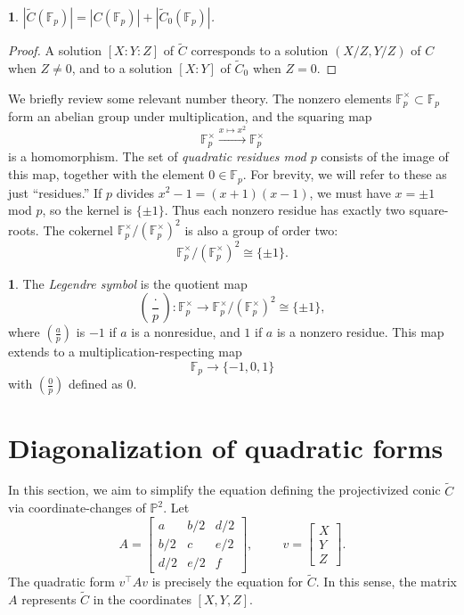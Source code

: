 \documentclass[10pt,a4paper]{amsart}
\numberwithin{equation}{section}
\numberwithin{figure}{section}
\theoremstyle{definition}
\theoremstyle{remark}
\theoremstyle{plain}
\theoremstyle{plain}
\theoremstyle{definition}
\newtheorem{defn}{\protect\definitionname}[section]
\theoremstyle{plain}
\theoremstyle{plain}
\newtheorem{lem}{\protect\lemmaname}[section]
\providecommand{\definitionname}{Definition}
\providecommand{\lemmaname}{Lemma}
\newcommand{\legendre}[2]{\genfrac{(}{)}{}{}{#1}{#2}}
\renewcommand{\P}{\mathbb{P}}
\newcommand{\F}{\mathbb{F}}
\begin{document}
    \begin{lem}\label{lem:relate-solutions-affine-proj}
        $|\widetilde{C}(\F_p)| = |C(\F_p)| + |\widetilde{C}_0(\F_p)|$.
    \end{lem} 
    \begin{proof}
        A solution $[X:Y:Z]$ of $\widetilde{C}$ corresponds 
        to a solution $(X/Z,Y/Z)$ of $C$ when $Z \neq 0$,
        and to a solution $[X:Y]$ of $\widetilde{C}_0$ 
        when $Z = 0$.  
    \end{proof}
	We briefly review some relevant number theory.
	The nonzero elements $\F_p^\times \subset \F_p$ form an abelian
	group under multiplication, and the squaring map 
	\[ \F^\times_p \xrightarrow{x \mapsto x^2} \F^\times_p \] 
	is a homomorphism. The set of \emph{quadratic residues mod $p$} consists of the image of this map, together with the element $0\in \F_p$. For brevity, we will refer to these as just ``residues.'' If $p$ divides $x^2 - 1 = (x+1)(x-1)$, we must have 
	$x = \pm 1$ mod $p$, so the kernel is $\{\pm 1\}$. Thus each nonzero residue has exactly two square-roots. 
	The cokernel $\F_p^\times / (\F_p^\times)^2$ is also a group of order two: 
	\[ \F_p^\times / (\F_p^\times)^2 \cong \{\pm 1\}.  \]
	\begin{defn}
		The \emph{Legendre symbol} is the quotient map    
		\[ \legendre{\cdot}{p}: 
		\F_p^\times \to \F_p^\times / (\F_p^\times)^2 \cong \{\pm 1\}, \]
		where $\legendre{a}{p}$ is $-1$ if $a$ is a nonresidue,
		and $1$ if $a$ is a nonzero residue. This map extends to a multiplication-respecting map
		\[ \F_p \to \{-1,0,1\} \]
		with $\legendre{0}{p}$ defined as $0$.
	\end{defn}
	
    \section{Diagonalization of quadratic forms}
    \label{sec:diagonalizing-quadratic-forms} 

    In this section, we aim to simplify the equation defining the projectivized conic $\widetilde{C}$ via coordinate-changes of $\P^2$. Let
	\begin{equation*}
	A=\begin{bmatrix}
	a&b/2&d/2\\
	b/2&c&e/2\\
	d/2&e/2&f
	\end{bmatrix}, \hspace{1cm}
	v = \begin{bmatrix}
	X\\
	Y\\
	Z
	\end{bmatrix}.
	\end{equation*}
	The quadratic form $v^\top A v$ is precisely the equation for $\widetilde{C}$. In this sense, the matrix $A$ represents $\widetilde{C}$ in the coordinates $[X,Y,Z]$.
	
\end{document}
